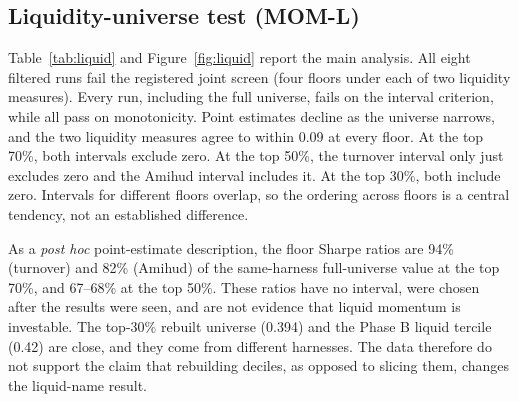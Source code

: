 \documentclass[11pt]{article}
\begin{document}
\subsection{Liquidity-universe test (MOM-L)}

Table~\ref{tab:liquid} and Figure~\ref{fig:liquid} report the main analysis. All eight
filtered runs fail the registered joint screen (four floors under each of two liquidity
measures). Every run, including the full universe, fails on the interval criterion,
while all pass on monotonicity. Point estimates decline as the universe narrows, and the
two liquidity measures agree to within 0.09 at every floor. At the top 70\%, both
intervals exclude zero. At the top 50\%, the turnover interval only just excludes zero
and the Amihud interval includes it. At the top 30\%, both include zero. Intervals for
different floors overlap, so the ordering across floors is a central tendency, not an
established difference.

As a \emph{post hoc} point-estimate description, the floor Sharpe ratios are 94\%
(turnover) and 82\% (Amihud) of the same-harness full-universe value at the top 70\%,
and 67--68\% at the top 50\%. These ratios have no interval, were chosen after the
results were seen, and are not evidence that liquid momentum is investable. The top-30\%
rebuilt universe (0.394) and the Phase B liquid tercile (0.42) are close, and they come
from different harnesses. The data therefore do not support the claim that rebuilding
deciles, as opposed to slicing them, changes the liquid-name result.
\end{document}

